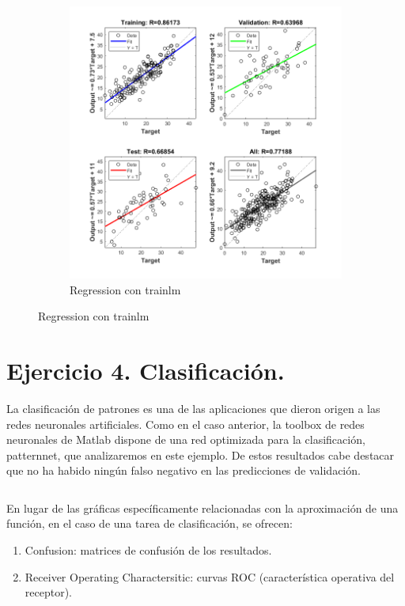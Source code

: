 \documentclass[a4paper, 12pt]{article}
\begin{document}
\begin{figure}[htp!]
\begin{subfigure}{0.49\textwidth}
                        \includegraphics[width=\textwidth]{figures/parte1/Ej3/Ej3_regression_trainlm_60.png}
                        \caption{Regression con trainlm}
                    \end{subfigure}
                \end{figure}

        
        \newpage
        \section{Ejercicio 4. Clasificación.}
            La clasificación de patrones es una de las aplicaciones que dieron origen a las redes neuronales artificiales. Como en el caso anterior, la toolbox de redes neuronales de Matlab dispone de una red optimizada para la clasificación, patternnet, que analizaremos en este ejemplo. De estos resultados cabe destacar que no ha habido ningún falso negativo en las predicciones de validación.

            \inputminted[fontsize=\scriptsize, linenos, breaklines=true, xleftmargin=0.75cm, frame=lines]{matlab}{code/parte1/Ej4.m}

            En lugar de las gráficas específicamente relacionadas con la aproximación de una función, en el caso de una tarea de clasificación, se ofrecen:
            \begin{enumerate}
                \item Confusion: matrices de confusión de los resultados.
                \item Receiver Operating Charactersitic: curvas ROC (característica operativa del receptor).
            \end{enumerate}
\end{document}
